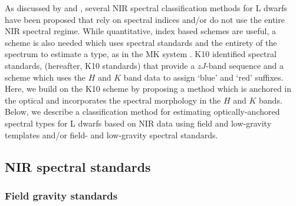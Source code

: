 \documentclass[12pt,preprint]{aastex}
\begin{document}
As discussed by \citet[\S~3.2]{Kirkpatrick05} and \citet[hereafter K10]{Kirkpatrick10}, several NIR spectral classification methods for L dwarfs have been proposed that rely on spectral indices and/or do not use the entire NIR spectral regime.
While quantitative, index based schemes are useful, a scheme is also needed which uses spectral standards and the entirety of the spectrum to estimate a type, as in the MK system \citep{Morgan:1984wy}.
K10 identified spectral standards, (hereafter, K10 standards) that provide a $zJ$-band sequence and a scheme which uses the $H$ and $K$ band data to assign `blue' and `red' suffixes.
Here, we build on the K10 scheme by proposing a method which is anchored in the optical and incorporates the spectral morphology in the $H$ and $K$ bands.
Below, we describe a classification method for estimating optically-anchored spectral types for L dwarfs based on NIR data using field and low-gravity templates and/or field- and low-gravity spectral standards.



\subsection{NIR spectral standards}
\subsubsection{Field gravity standards}
\label{sec:field_stds}
\end{document}
